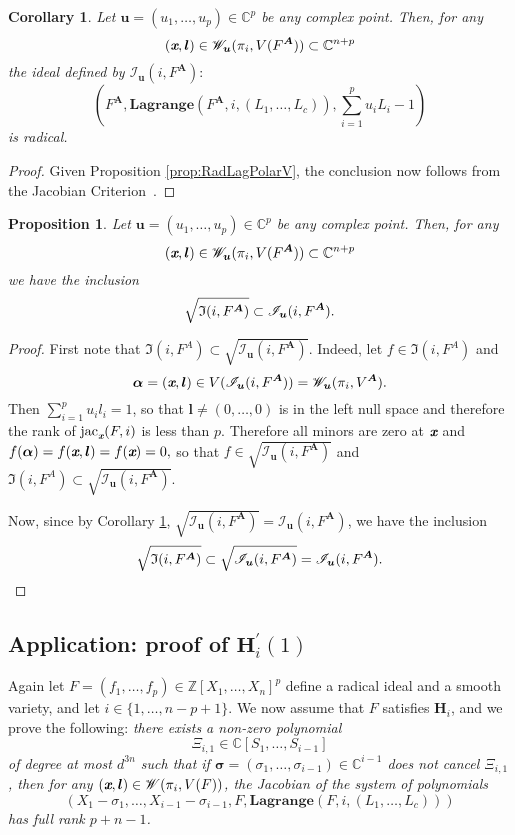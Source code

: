\documentclass[a4paper]{article}
\def\sW{\mathscr{W}}
\def\sI{\mathscr{I}}
\def\mA{{\bm A}}
\def\ub{{\bm u}}
\def\lb{{\bm l}}
\def\xb{\textit{\textbf{x}}}
\DeclareMathOperator{\jac}{jac}
\newcommand{\ZZ}{{\mathbb{Z}}}
\def\C{\mathbb{C}}
\def\IiA{\mathfrak{I}(i,F^A)}
\def\lagF{{\bm{Lagrange}}(F,i,(L_1,\hdots,L_c))}
\def\lagFA{{\bm{Lagrange}}(F^{\mA},i,(L_1,\hdots,L_c))}
\def\IilA{\mathscr{I}_{\ub}(i,F^{\mA})}
\def\WilA{\mathscr{W}_{\ub}(\pi_i,V^{\mA})}
\newtheorem{corollary}[theorem]{Corollary}
\newtheorem{prop}[theorem]{Proposition}
\begin{document}
    \begin{corollary}\label{cor:LagIdealRadical}
Let $\ub = (u_1,\hdots,u_p) \in \C^p$ be any complex point. Then, for any \[(\xb,\lb)\in \mathscr{W}_{\ub}(\pi_i,V(F^{\mA})) \subset \C^{n+p}\] the ideal defined by $\sI_{\ub}(i,F^{\mA}) :$\[ \left(F^{\mA},\lagFA,\sum_{i=1}^p u_iL_i-1\right)\] is radical.
    \end{corollary}
    \begin{proof}
    Given Proposition \ref{prop:RadLagPolarV}, the conclusion now follows from the Jacobian Criterion~\cite[Corollary 16.20]{ECA}.
    \end{proof}
    \begin{prop}\label{prop:polarVs2}
Let $\ub = (u_1,\hdots,u_p) \in \C^p$ be any complex point. Then, for any \[(\xb,\lb)\in \mathscr{W}_{\ub}(\pi_i,V(F^{\mA})) \subset \C^{n+p}\]we have the inclusion
    \[
    \sqrt{\frak{I}(i,F^{\mA})} \subset \IilA.
    \]
    \end{prop}
    \begin{proof}
    First note that $\IiA \subset \sqrt{\IilA}.$ Indeed, let $f \in \IiA$ and \[\bm \alpha = (\xb,\lb) \in V(\IilA)=\WilA.\] Then $\sum_{i=1}^p u_i l_i = 1$, so that $\lb \not = (0,\hdots,0)$ is in the left null space and therefore the rank of $\jac_{\xb} (F,i)$ is less than $p.$ Therefore all minors are zero at $\xb$ and $f(\bm \alpha)= f(\xb,\lb)=f(\xb)=0,$ so that $f \in \sqrt{\IilA}$ and $\IiA \subset \sqrt{\IilA}.$
    \par 
    Now, since by Corollary \ref{cor:LagIdealRadical}, $\sqrt{\IilA} = \IilA$, we have the inclusion
    \[
    \sqrt{\frak{I}(i,F^{\mA})} \subset \sqrt{\IilA} = \IilA.
    \]
    \end{proof}


\subsection{Application: proof of $\textbf{H}_i^{'}(1)$}\label{proof:hip}
Again let $F = (f_1,\hdots,f_p) \in \ZZ[X_1,\hdots,X_n]^p$  define a radical ideal and a smooth variety, and let $i\in \{1,\hdots,n-p+1\}$. We now assume
that $F$ satisfies $\textbf{H}_i$, and we prove the following: {\em
  there exists a non-zero polynomial 
  \[
  \Xi_{i,1} \in
  \C[S_1,\dots,S_{i-1}]
  \]
  of degree at most $d^{3n}$ such that if $
  \bm \sigma = (\sigma_1,\hdots,\sigma_{i-1}) \in \C^{i-1}$ does not cancel
  $\Xi_{i,1}$, then for any $(\xb,\lb) \in \sW(\pi_i,V(F))$, the Jacobian of the system of polynomials
  $$\left(X_1-\sigma_1,\dots,X_{i-1}-\sigma_{i-1},F,\lagF\right)$$ has full rank $p+n-1$.}
\end{document}

